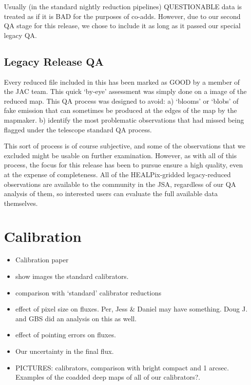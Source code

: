 \documentclass[usenatbib]{mnras}
\newcommand{\status}[1]{\textsf{#1}}
\begin{document}
Usually (in the standard nightly reduction pipelines)
\status{QUESTIONABLE} data is treated as if it is \status{BAD} for the
purposes of co-adds. However, due to our second QA stage for this
release, we chose to include it as long as it passed our special
legacy QA.

\subsection{Legacy Release QA}

Every reduced file included in this has been marked as \status{GOOD}
by a member of the JAC team. This quick `by-eye' assessment was simply
done on a image of the reduced map. This QA process was designed to
avoid: a) `blooms' or `blobs' of fake emission that can sometimes be
produced at the edges of the map by the mapmaker.  b) identify the
most problematic observations that had missed being flagged under the
telescope standard QA process.

This sort of process is of course subjective, and some of the
observations that we excluded might be usable on further
examination. However, as with all of this process, the focus for this
release has been to pursue ensure a high quality, even at the expense
of completeness. All of the HEALPix-gridded legacy-reduced
observations are available to the community in the JSA, regardless of
our QA analysis of them, so interested users can evaluate the full
available data themselves.


\section{Calibration}

\begin{itemize}
\item Calibration paper \citep{Dempsey2013}
\item show images the standard calibrators.
\item comparison with `standard' calibrator reductions
\item effect of pixel size on fluxes. Per, Jess \& Daniel may have
  something. Doug J. and GBS did an analysis on this as well.
\item effect of pointing errors on fluxes.
\item Our uncertainty in the final flux.

\item PICTURES: calibrators, comparison with bright compact and 1
  arcsec. Examples of the coadded deep maps of all of our
  calibrators?.
\end{itemize}
\end{document}
